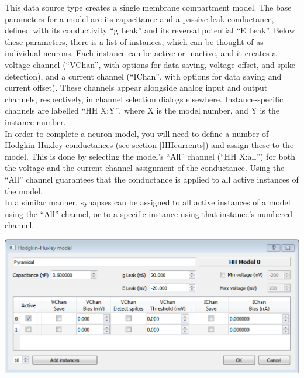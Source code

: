 \documentclass{article}
\begin{document}
This data source type creates a single membrane compartment model.
The base parameters for a model are its capacitance and a passive leak conductance,
defined with its conductivity ``g Leak'' and its reversal potential ``E Leak''.
Below these parameters, there is a list of instances, which can be thought of as
individual neurons. Each instance can be active or inactive, and it creates a voltage
channel (``VChan'', with options for data saving, voltage offset, and spike detection),
and a current channel (``IChan'', with options for data saving and current offset).
These channels appear alongside analog input and output channels, respectively, in
channel selection dialogs elsewhere. Instance-specific channels are labelled ``HH X:Y'',
where X is the model number, and Y is the instance number. \\
In order to complete a neuron model, you will need to define a number of Hodgkin-Huxley
conductances (see section \ref{HHcurrents}) and assign these to the model. This is done
by selecting the model's ``All'' channel (``HH X:all'') for both the voltage and the current channel
assignment of the conductance. Using the ``All'' channel guarantees that the conductance
is applied to all active instances of the model. \\
In a similar manner, synapses can be assigned to all active instances of a model
using the ``All'' channel, or to a specific instance using that instance's numbered
channel.\\

\noindent
\parbox{\textwidth}{
	\includegraphics[scale=0.5]{HHmodel}
} \\[0.2cm]
\end{document}
